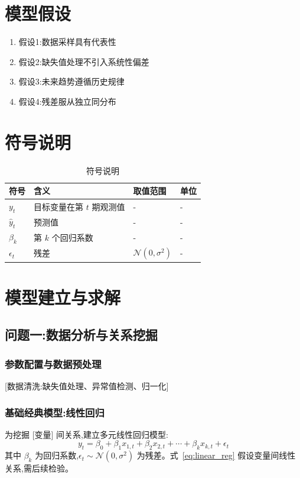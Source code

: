 \documentclass[12pt,a4paper]{ctexart}
\begin{document}
\section{模型假设}
\begin{enumerate}
  \item 假设1:数据采样具有代表性
  \item 假设2:缺失值处理不引入系统性偏差
  \item 假设3:未来趋势遵循历史规律
  \item 假设4:残差服从独立同分布
\end{enumerate}

\section{符号说明}
\begin{table}[H]
\centering
\caption{符号说明}
\label{tab:symbols}
\begin{tabular}{llll}
\toprule
符号 & 含义 & 取值范围 & 单位 \\
\midrule
$y_t$ & 目标变量在第 $t$ 期观测值 & - & - \\
$\hat{y}_t$ & 预测值 & - & - \\
$\beta_k$ & 第 $k$ 个回归系数 & - & - \\
$\epsilon_t$ & 残差 & $\mathcal{N}(0, \sigma^2)$ & - \\
\bottomrule
\end{tabular}
\end{table}

\section{模型建立与求解}

\subsection{问题一:数据分析与关系挖掘}

\subsubsection{参数配置与数据预处理}
[数据清洗:缺失值处理、异常值检测、归一化]

\subsubsection{基础经典模型:线性回归}
为挖掘 [变量] 间关系,建立多元线性回归模型:
\begin{equation}
y_t = \beta_0 + \beta_1 x_{1,t} + \beta_2 x_{2,t} + \cdots + \beta_k x_{k,t} + \epsilon_t
\label{eq:linear_reg}
\end{equation}
其中 $\beta_k$ 为回归系数,$\epsilon_t \sim \mathcal{N}(0, \sigma^2)$ 为残差。式~\eqref{eq:linear_reg} 假设变量间线性关系,需后续检验。
\end{document}
